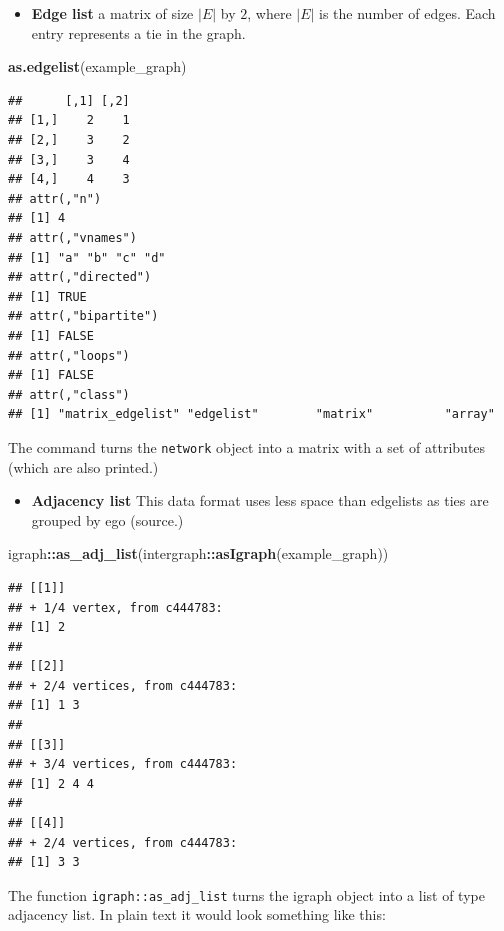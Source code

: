 \documentclass[]{book}
\newenvironment{Shaded}{\begin{snugshade}}{\end{snugshade}}
\newcommand{\KeywordTok}[1]{\textcolor[rgb]{0.13,0.29,0.53}{\textbf{#1}}}
\newcommand{\NormalTok}[1]{#1}
\newcommand{\OperatorTok}[1]{\textcolor[rgb]{0.81,0.36,0.00}{\textbf{#1}}}
\providecommand{\tightlist}{%
  \setlength{\itemsep}{0pt}\setlength{\parskip}{0pt}}
\begin{document}
\begin{itemize}
\tightlist
\item
  \textbf{Edge list} a matrix of size \(|E|\) by \(2\), where \(|E|\) is the number of edges.
  Each entry represents a tie in the graph.
\end{itemize}

\begin{Shaded}
\begin{Highlighting}[]
\KeywordTok{as.edgelist}\NormalTok{(example_graph)}
\end{Highlighting}
\end{Shaded}

\begin{verbatim}
##      [,1] [,2]
## [1,]    2    1
## [2,]    3    2
## [3,]    3    4
## [4,]    4    3
## attr(,"n")
## [1] 4
## attr(,"vnames")
## [1] "a" "b" "c" "d"
## attr(,"directed")
## [1] TRUE
## attr(,"bipartite")
## [1] FALSE
## attr(,"loops")
## [1] FALSE
## attr(,"class")
## [1] "matrix_edgelist" "edgelist"        "matrix"          "array"
\end{verbatim}

The command turns the \texttt{network} object into a matrix with a set of attributes
(which are also printed.)

\begin{itemize}
\tightlist
\item
  \textbf{Adjacency list} This data format uses less space than edgelists as ties are
  grouped by ego (source.)
\end{itemize}

\begin{Shaded}
\begin{Highlighting}[]
\NormalTok{igraph}\OperatorTok{::}\KeywordTok{as_adj_list}\NormalTok{(intergraph}\OperatorTok{::}\KeywordTok{asIgraph}\NormalTok{(example_graph)) }
\end{Highlighting}
\end{Shaded}

\begin{verbatim}
## [[1]]
## + 1/4 vertex, from c444783:
## [1] 2
## 
## [[2]]
## + 2/4 vertices, from c444783:
## [1] 1 3
## 
## [[3]]
## + 3/4 vertices, from c444783:
## [1] 2 4 4
## 
## [[4]]
## + 2/4 vertices, from c444783:
## [1] 3 3
\end{verbatim}

The function \texttt{igraph::as\_adj\_list} turns the igraph object into a list of
type adjacency list. In plain text it would look something like this:
\end{document}
